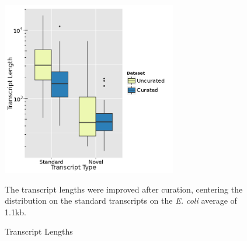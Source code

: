 \begin{figure}
\small
\vspace{-20pt}
\begin{center}
\includegraphics[width=\linewidth,height=3in]{images/Assembly/Curation/PairvsCuration_length.png}
\caption{Transcript Lengths}\label{fig:5.22}
The transcript lengths were improved after curation, centering the distribution on the standard transcripts on the \textit{E. coli} average of 1.1kb\cite{86}.
\end{center}
\vspace{-20pt}
\end{figure}
